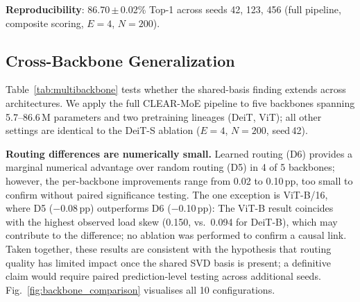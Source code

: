 \documentclass[conference]{IEEEtran}
\begin{document}
\textbf{Reproducibility}: 86.70\,$\pm$\,0.02\% Top-1 across seeds 42, 123, 456 (full pipeline, composite scoring, $E{=}4$, $N{=}200$).

\subsection{Cross-Backbone Generalization}
\label{sec:cross_backbone}

Table~\ref{tab:multibackbone} tests whether the shared-basis finding extends across architectures. We apply the full CLEAR-MoE pipeline to five backbones spanning 5.7--86.6\,M parameters and two pretraining lineages (DeiT, ViT); all other settings are identical to the DeiT-S ablation ($E{=}4$, $N{=}200$, seed\,42).

\begin{table}[!t]
\caption{Cross-backbone generalization (Imagenette, $E{=}4$, $N{=}200$, seed\,42). D5\,=\,random routing; D6\,=\,learned linear router. $|\Delta|{\leq}0.10$\,pp across all 10 configurations.}
\label{tab:multibackbone}
\centering
\small
\setlength{\tabcolsep}{3pt}
\end{table}

\textbf{Routing differences are numerically small.} Learned routing (D6) provides a marginal numerical advantage over random routing (D5) in 4 of 5 backbones; however, the per-backbone improvements range from 0.02 to 0.10\,pp, too small to confirm without paired significance testing. The one exception is ViT-B/16, where D5 ($-$0.08\,pp) outperforms D6 ($-$0.10\,pp): The ViT-B result coincides with the highest observed load skew (0.150, vs.\ 0.094 for DeiT-B), which may contribute to the difference; no ablation was performed to confirm a causal link. Taken together, these results are consistent with the hypothesis that routing quality has limited impact once the shared SVD basis is present; a definitive claim would require paired prediction-level testing across additional seeds. Fig.~\ref{fig:backbone_comparison} visualises all 10 configurations.
\end{document}
